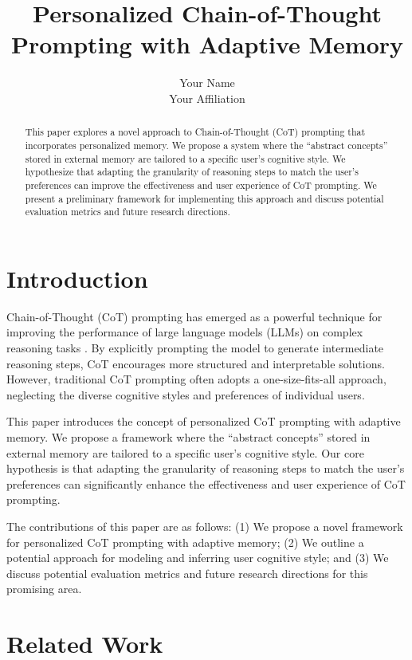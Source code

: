 \documentclass{article}
\title{Personalized Chain-of-Thought Prompting with Adaptive Memory}
\author{Your Name \\ Your Affiliation}
\date{}
\begin{document}
\maketitle

\begin{abstract}
This paper explores a novel approach to Chain-of-Thought (CoT) prompting that incorporates personalized memory. We propose a system where the ``abstract concepts'' stored in external memory are tailored to a specific user's cognitive style. We hypothesize that adapting the granularity of reasoning steps to match the user's preferences can improve the effectiveness and user experience of CoT prompting. We present a preliminary framework for implementing this approach and discuss potential evaluation metrics and future research directions.
\end{abstract}

\section{Introduction}

Chain-of-Thought (CoT) prompting has emerged as a powerful technique for improving the performance of large language models (LLMs) on complex reasoning tasks \cite{wei2022chain}. By explicitly prompting the model to generate intermediate reasoning steps, CoT encourages more structured and interpretable solutions. However, traditional CoT prompting often adopts a one-size-fits-all approach, neglecting the diverse cognitive styles and preferences of individual users.

This paper introduces the concept of personalized CoT prompting with adaptive memory. We propose a framework where the ``abstract concepts'' stored in external memory are tailored to a specific user's cognitive style. Our core hypothesis is that adapting the granularity of reasoning steps to match the user's preferences can significantly enhance the effectiveness and user experience of CoT prompting.

The contributions of this paper are as follows: (1) We propose a novel framework for personalized CoT prompting with adaptive memory; (2) We outline a potential approach for modeling and inferring user cognitive style; and (3) We discuss potential evaluation metrics and future research directions for this promising area.

\section{Related Work}
\end{document}
